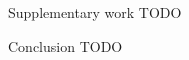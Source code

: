 \begin{frame}{Supplementary work}
	TODO
\end{frame}

\begin{frame}[label={lastslide}]{Conclusion}
	TODO
\end{frame}